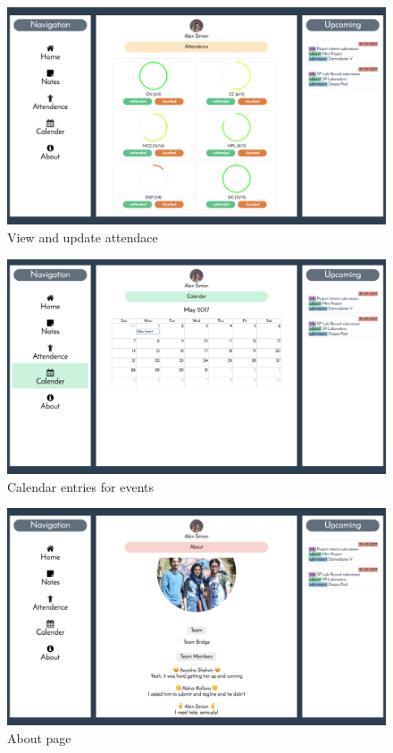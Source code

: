 \begin{figure}[htb]
    \centering
    \includegraphics[width=\linewidth]{attendance.png}
    \caption{View and update attendace}
    \label{fig:attendance} %
\end{figure}

\begin{figure}[htb]
    \centering
    \includegraphics[width=\linewidth]{calendar.png}
    \caption{Calendar entries for events}
    \label{fig:calendar} %
\end{figure}

\begin{figure}[htb]
    \centering
    \includegraphics[width=\linewidth]{aboutpage.png}
    \caption{About page}
    \label{fig:aboutpage} %
\end{figure}

